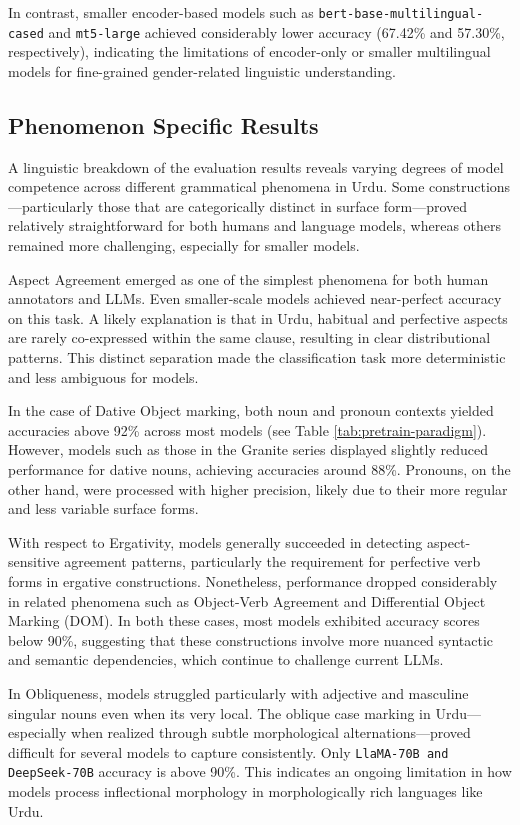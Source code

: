 \documentclass[11pt]{article}
\begin{document}
In contrast, smaller encoder-based models such as \texttt{bert-base-multilingual-cased} and \texttt{mt5-large} achieved considerably lower accuracy (67.42\% and 57.30\%, respectively), indicating the limitations of encoder-only or smaller multilingual models for fine-grained gender-related linguistic understanding. 

\subsection{Phenomenon Specific Results}
A linguistic breakdown of the evaluation results reveals varying degrees of model competence across different grammatical phenomena in Urdu. Some constructions—particularly those that are categorically distinct in surface form—proved relatively straightforward for both humans and language models, whereas others remained more challenging, especially for smaller models.

Aspect Agreement emerged as one of the simplest phenomena for both human annotators and LLMs. Even smaller-scale models achieved near-perfect accuracy on this task. A likely explanation is that in Urdu, habitual and perfective aspects are rarely co-expressed within the same clause, resulting in clear distributional patterns. This distinct separation made the classification task more deterministic and less ambiguous for models.

In the case of Dative Object marking, both noun and pronoun contexts yielded accuracies above 92\% across most models (see  Table \ref{tab:pretrain-paradigm}). However, models such as those in the Granite series displayed slightly reduced performance for dative nouns, achieving accuracies around 88\%. Pronouns, on the other hand, were processed with higher precision, likely due to their more regular and less variable surface forms.

With respect to Ergativity, models generally succeeded in detecting aspect-sensitive agreement patterns, particularly the requirement for perfective verb forms in ergative constructions. Nonetheless, performance dropped considerably in related phenomena such as Object-Verb Agreement and Differential Object Marking (DOM). In both these cases, most models exhibited accuracy scores below 90\%, suggesting that these constructions involve more nuanced syntactic and semantic dependencies, which continue to challenge current LLMs.

In Obliqueness, models struggled particularly with adjective and masculine singular nouns even when its very local. The oblique case marking in Urdu—especially when realized through subtle morphological alternations—proved difficult for several models to capture consistently. Only \texttt{LlaMA-70B and DeepSeek-70B} accuracy is above 90\%. This indicates an ongoing limitation in how models process inflectional morphology in morphologically rich languages like Urdu.
\end{document}
